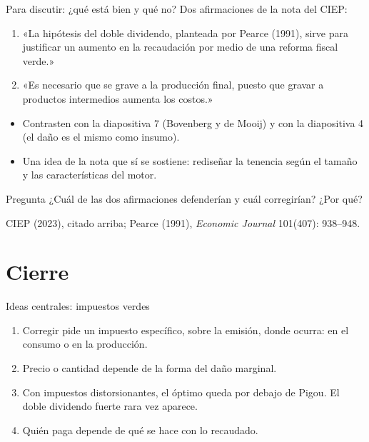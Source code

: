 \documentclass[aspectratio=169,11pt]{beamer}
\newcommand{\fuente}[1]{\par\vfill{\small\color{cGris}#1\par}}
\begin{document}
\begin{frame}{Para discutir: ¿qué está bien y qué no?}
  Dos afirmaciones de la nota del CIEP:
  \begin{enumerate}
    \item «La hipótesis del doble dividendo, planteada por Pearce (1991), sirve para justificar un aumento en la recaudación por medio de una reforma fiscal verde.»
    \item «Es necesario que se grave a la producción final, puesto que gravar a productos intermedios aumenta los costos.»
  \end{enumerate}
  \pause
  \begin{itemize}
    \item Contrasten con la diapositiva 7 (Bovenberg y de Mooij) y con la diapositiva 4 (el daño es el mismo como insumo).
    \item Una idea de la nota que sí se sostiene: rediseñar la tenencia según el tamaño y las características del motor.
  \end{itemize}
  \pause
  \begin{alertblock}{Pregunta}
    ¿Cuál de las dos afirmaciones defenderían y cuál corregirían? ¿Por qué?
  \end{alertblock}
  \fuente{CIEP (2023), citado arriba; Pearce (1991), \emph{Economic Journal} 101(407): 938--948.}
\end{frame}

\section{Cierre}

\begin{frame}{Ideas centrales: impuestos verdes}
  \begin{enumerate}
    \item Corregir pide un impuesto específico, sobre la emisión, donde ocurra: en el consumo o en la producción.
    \item Precio o cantidad depende de la forma del daño marginal.
    \item Con impuestos distorsionantes, el óptimo queda por debajo de Pigou. El doble dividendo fuerte rara vez aparece.
    \item Quién paga depende de qué se hace con lo recaudado.
  \end{enumerate}
\end{frame}
\end{document}
